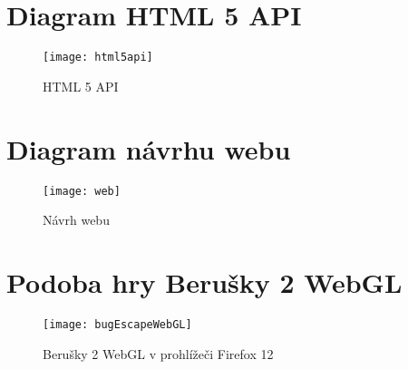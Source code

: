 
\chapter{Diagram HTML 5 API}
\label{priloha:html5}
\begin{figure}[htb]
\centering
\texttt{[image: html5api]}
\caption{HTML 5 API}
\label{fig:html5api}
\end{figure}

\chapter{Diagram návrhu webu}
\begin{figure}[htb]
\centering
\texttt{[image: web]}
\caption{Návrh webu}
\label{fig:web}
\end{figure}


\chapter{Podoba hry Berušky 2 WebGL}
\begin{figure}[htb]
\centering
\texttt{[image: bugEscapeWebGL]}
\caption{Berušky 2 WebGL v prohlížeči Firefox 12}
\label{fig:gameImage}
\end{figure}

